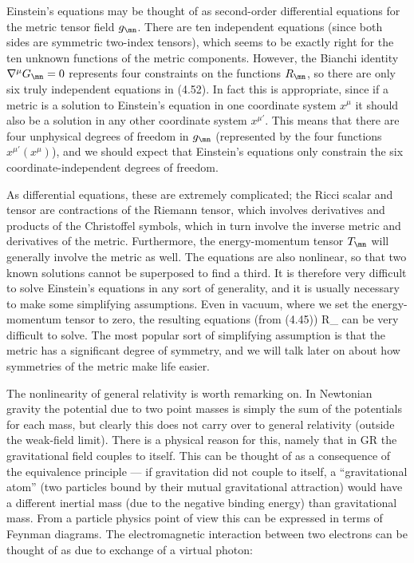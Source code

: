 \documentclass[12pt]{article}
\begin{document}
Einstein's equations may be thought of as second-order differential
equations for the metric tensor field $g_\mn$.  There are ten 
independent equations (since both sides are symmetric two-index
tensors), which seems to be exactly right for the ten unknown functions
of the metric components.  However, the Bianchi identity $\nabla^\mu
G_\mn=0$ represents four constraints on the functions $R_{\mn}$, so
there are only six truly independent equations in (4.52).  In fact
this is appropriate, since if a metric is a solution to Einstein's
equation in one coordinate system $x^\mu$ it should also be a 
solution in any other coordinate system $x^{\mu'}$.  This means that
there are four unphysical degrees of freedom in $g_\mn$ (represented
by the four functions $x^{\mu'}(x^\mu)$), and we should expect that
Einstein's equations only constrain the six coordinate-independent
degrees of freedom.

As differential equations, these are
extremely complicated; the Ricci scalar and tensor are contractions 
of the Riemann tensor, which involves derivatives and products 
of the Christoffel symbols, which in turn involve the inverse metric
and derivatives of the metric.  Furthermore, the energy-momentum
tensor $T_\mn$ will generally involve the metric as well.  The
equations are also nonlinear, so that two known solutions cannot
be superposed to find a third.  It is therefore very difficult to
solve Einstein's equations in any sort of generality, and it is
usually necessary to make some simplifying assumptions.  Even
in vacuum, where we set the energy-momentum tensor to zero, the
resulting equations (from (4.45))
\be
  R_\label{4.53}
\ee
can be very difficult to solve.  The most popular sort of 
simplifying assumption is that the metric has a significant
degree of symmetry, and we will talk later on about how symmetries
of the metric make life easier.

The nonlinearity of general relativity is worth remarking on.  In
Newtonian gravity the potential due to two point masses is simply
the sum of the potentials for each mass, but clearly this does not
carry over to general relativity (outside the weak-field limit).
There is a physical reason for this, namely that in GR the
gravitational field couples to itself.  This can be thought of as
a consequence of the equivalence principle --- if gravitation did
not couple to itself, a ``gravitational atom'' (two particles
bound by their mutual gravitational attraction) would have a 
different inertial mass (due to the negative binding energy) than
gravitational mass.  From a particle physics point of view this
can be expressed in terms of Feynman diagrams.  The electromagnetic
interaction between two electrons can be thought of as due to 
exchange of a virtual photon:
\end{document}
